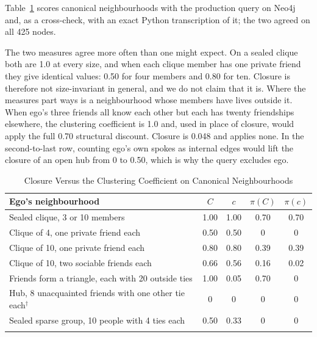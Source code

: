 Table~\ref{tab:closure} scores canonical neighbourhoods with the production
 query on Neo4j and, as a cross-check, with an exact Python
transcription of it; the two agreed on all 425 nodes.

The two measures agree more often than one might expect. On a sealed clique both are
1.0 at every size, and when each clique member has one private friend they give
identical values: 0.50 for four members and 0.80 for ten. Closure is therefore not
size-invariant in general, and we do not claim that it is. Where the measures part
ways is a neighbourhood whose members have lives outside it. When ego's three friends
all know each other but each has twenty friendships elsewhere, the clustering
coefficient is 1.0 and, used in place of closure, would apply the full 0.70 structural
discount. Closure is 0.048 and applies none. In the second-to-last row, counting
ego's own spokes as internal edges would lift the closure of an open hub from 0 to
0.50, which is why the query excludes ego.

\begin{table}[!t]
\caption{Closure Versus the Clustering Coefficient on Canonical Neighbourhoods}
\label{tab:closure}
\centering
\footnotesize
\begin{tabular}{@{}>{\raggedright}p{}cccc@{}}
\toprule
Ego's neighbourhood & $C$ & $c$ & $\pi(C)$ & $\pi(c)$ \\
\midrule
Sealed clique, 3 or 10 members & 1.00 & 1.00 & 0.70 & 0.70 \\
Clique of 4, one private friend each & 0.50 & 0.50 & 0 & 0 \\
Clique of 10, one private friend each & 0.80 & 0.80 & 0.39 & 0.39 \\
Clique of 10, two sociable friends each & 0.66 & 0.56 & 0.16 & 0.02 \\
Friends form a triangle, each with 20 outside ties & 1.00 & 0.05 & 0.70 & 0 \\
Hub, 8 unacquainted friends with one other tie each$^\dagger$ & 0 & 0 & 0 & 0 \\
Sealed sparse group, 10 people with 4 ties each & 0.50 & 0.33 & 0 & 0 \\
\bottomrule
\multicolumn{5}{@{}p{0.95\columnwidth}@{}}{\scriptsize $C$: clustering coefficient;
$c$: closure~\eqref{eq:closure}; $\pi(\cdot)$: structural penalty when that measure is
used. $^\dagger$Counting ego inside its own neighbourhood gives $c=0.50$.}
\end{tabular}
\end{table}
